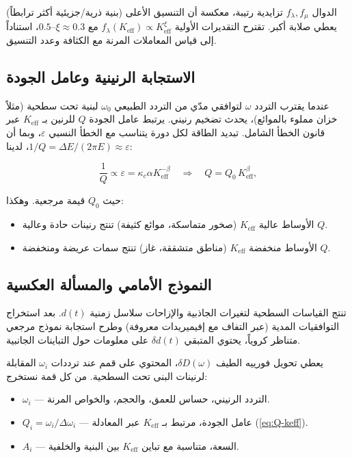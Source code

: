 \documentclass[12pt,a4paper]{article}
\newcommand{\Keff}{K_{\mathrm{eff}}}
\newcommand{\kappac}{\kappa_c}
\newcommand{\eps}{\varepsilon}
\theoremstyle{remark}
\begin{document}
	الدوال \(f_\lambda, f_\mu\) تزايدية رتيبة، معكسة أن التنسيق الأعلى (بنية ذرية/جزيئية أكثر ترابطاً) يعطي صلابة أكبر. تقترح التقديرات الأولية \(f_\lambda(\Keff) \propto \Keff^{\xi}\) مع \(\xi \approx 0.3\)–\(0.5\)، استناداً إلى قياس المعاملات المرنة مع الكثافة وعدد التنسيق.
	
	\subsection{الاستجابة الرنينية وعامل الجودة}
	
	عندما يقترب التردد \(\omega\) لتوافقي مدّي من التردد الطبيعي \(\omega_0\) لبنية تحت سطحية (مثلاً خزان مملوء بالموائع)، يحدث تضخيم رنيني. يرتبط عامل الجودة \(Q\) للرنين بـ \(\Keff\) عبر قانون الخطأ الشامل. تبديد الطاقة لكل دورة يتناسب مع الخطأ النسبي \(\eps\)، وبما أن \(1/Q = \Delta E / (2\pi E) \approx \eps\)، لدينا:
	
	\begin{equation}
		\frac{1}{Q} \propto \eps = \kappac \alpha \Keff^{-\beta} \quad \Longrightarrow \quad Q = Q_0 \, \Keff^{\beta},
		\label{eq:Q-keff}
	\end{equation}
	
	حيث \(Q_0\) قيمة مرجعية. وهكذا:
	\begin{itemize}
		\item الأوساط عالية \(\Keff\) (صخور متماسكة، موائع كثيفة) تنتج رنينات حادة وعالية \(Q\).
		\item الأوساط منخفضة \(\Keff\) (مناطق متشققة، غاز) تنتج سمات عريضة ومنخفضة \(Q\).
	\end{itemize}
	
	\subsection{النموذج الأمامي والمسألة العكسية}
	
	تنتج القياسات السطحية لتغيرات الجاذبية والإزاحات سلاسل زمنية \(d(t)\). بعد استخراج التوافقيات المدية (عبر التفاف مع إفيميريدات معروفة) وطرح استجابة نموذج مرجعي متناظر كروياً، يحتوي المتبقي \(\delta d(t)\) على معلومات حول التباينات الجانبية.
	
	يعطي تحويل فورييه الطيف \(\delta D(\omega)\)، المحتوي على قمم عند ترددات \(\omega_i\) المقابلة لرنينات البنى تحت السطحية. من كل قمة نستخرج:
	
	\begin{itemize}
		\item \(\omega_i\) — التردد الرنيني، حساس للعمق، والحجم، والخواص المرنة.
		\item \(Q_i = \omega_i / \Delta \omega_i\) — عامل الجودة، مرتبط بـ \(\Keff\) عبر المعادلة (\ref{eq:Q-keff}).
		\item \(A_i\) — السعة، متناسبة مع تباين \(\Keff\) بين البنية والخلفية.
	\end{itemize}
	
\end{document}
